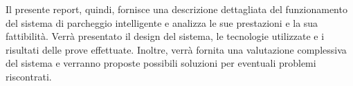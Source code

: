 \documentclass[../../Report.tex]{subfiles}
\begin{document}
    Il presente report, quindi, fornisce una descrizione dettagliata del funzionamento del sistema di parcheggio intelligente e analizza le sue prestazioni e la sua fattibilità. Verrà presentato il design del sistema, le tecnologie utilizzate e i risultati delle prove effettuate. Inoltre, verrà fornita una valutazione complessiva del sistema e verranno proposte possibili soluzioni per eventuali problemi riscontrati.
\end{document}

